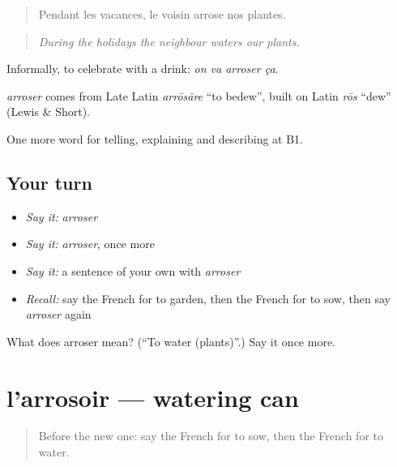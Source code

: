 \begin{quote}
Pendant les vacances, le voisin arrose nos plantes.
\end{quote}

\begin{quote}
\emph{During the holidays the neighbour waters our plants.}
\end{quote}

Informally, to celebrate with a drink: \emph{on va arroser ça}.

\begin{cousinweb}
\emph{arroser} comes from Late Latin \emph{arrōsāre} \textquotedblleft{}to bedew\textquotedblright{}, built on Latin \emph{rōs} \textquotedblleft{}dew\textquotedblright{} (Lewis \& Short).
\end{cousinweb}

\begin{grammarlens}[title={What you've built}]
One more word for telling, explaining and describing at B1.
\end{grammarlens}

\subsection*{Your turn}
\begin{itemize}
\raggedright
  \item \emph{Say it:} \emph{arroser}
  \item \emph{Say it:} \emph{arroser}, once more
  \item \emph{Say it:} a sentence of your own with \emph{arroser}
  \item \emph{Recall:} say the French for to garden, then the French for to sow, then say \emph{arroser} again
\end{itemize}

\begin{tcolorbox}[breakable,colback=teal!4,colframe=teal!35!black,title={Before you move on}]
What does arroser mean? (\textquotedblleft{}To water (plants)\textquotedblright{}.) Say it once more.
\end{tcolorbox}
\section[l'arrosoir]{l'arrosoir — watering can}

\label{lesson:FR-C503-arrosoir}



\begin{quote}
Before the new one: say the French for to sow, then the French for to water.
\end{quote}

